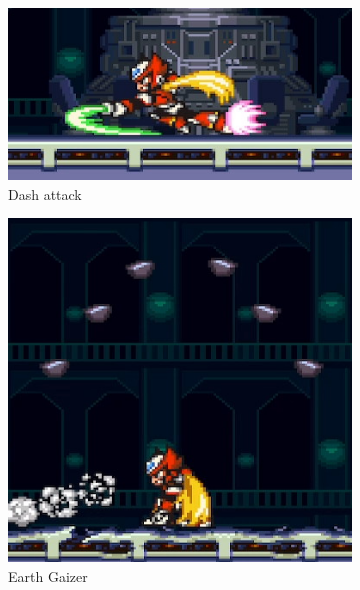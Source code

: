 \begin{figure}[htp]
	\begin{subfigure}{0.4\linewidth}
		\centering
		\includegraphics[width=\linewidth]{figures/X2/Hunter_stages/Zero_dash.png}
		\caption{Dash attack}
	\end{subfigure}	
	\begin{subfigure}{0.4\linewidth}
		\centering
		\includegraphics[width=\linewidth]{figures/X2/Hunter_stages/Zero_earth_gaizer.png}
		\caption{Earth Gaizer}
	\end{subfigure}	
	\begin{subfigure}{0.3\linewidth}
		\centering

\end{subfigure}
\end{figure}
